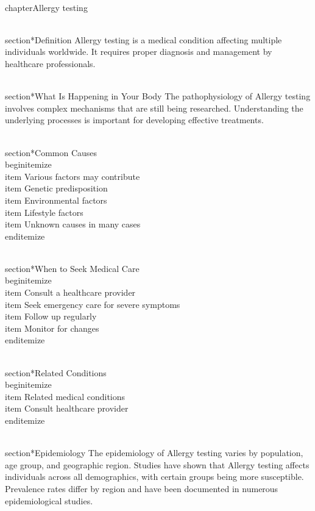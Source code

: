 
\\chapter{Allergy testing}

\\section*{Definition}
Allergy testing is a medical condition affecting multiple individuals worldwide. It requires proper diagnosis and management by healthcare professionals.

\\section*{What Is Happening in Your Body}
The pathophysiology of Allergy testing involves complex mechanisms that are still being researched. Understanding the underlying processes is important for developing effective treatments.

\\section*{Common Causes}
\\begin{itemize}
\\item Various factors may contribute\n  \\item Genetic predisposition\n  \\item Environmental factors\n  \\item Lifestyle factors\n  \\item Unknown causes in many cases
\\end{itemize}

\\section*{When to Seek Medical Care}
\\begin{itemize}
\\item Consult a healthcare provider\n  \\item Seek emergency care for severe symptoms\n  \\item Follow up regularly\n  \\item Monitor for changes
\\end{itemize}

\\section*{Related Conditions}
\\begin{itemize}
\\item Related medical conditions\n  \\item Consult healthcare provider
\\end{itemize}

\\section*{Epidemiology}
The epidemiology of Allergy testing varies by population, age group, and geographic region. Studies have shown that Allergy testing affects individuals across all demographics, with certain groups being more susceptible. Prevalence rates differ by region and have been documented in numerous epidemiological studies.

